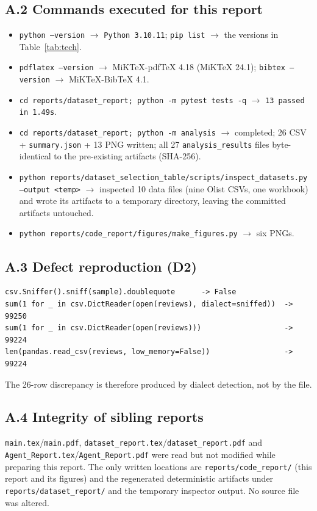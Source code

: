 \documentclass[11pt,a4paper]{article}
\newcommand{\code}[1]{\texttt{#1}}
\begin{document}
\subsection*{A.2 Commands executed for this report}
\begin{itemize}
\item \code{python --version} $\rightarrow$ \code{Python 3.10.11}; \code{pip list} $\rightarrow$ the versions in Table~\ref{tab:tech}.
\item \code{pdflatex --version} $\rightarrow$ MiKTeX-pdfTeX 4.18 (MiKTeX 24.1); \code{bibtex --version} $\rightarrow$ MiKTeX-BibTeX 4.1.
\item \code{cd reports/dataset\_report; python -m pytest tests -q} $\rightarrow$ \code{13 passed in 1.49s}.
\item \code{cd reports/dataset\_report; python -m analysis} $\rightarrow$ completed; 26 CSV + \code{summary.json} + 13 PNG written; all 27 \code{analysis\_results} files byte-identical to the pre-existing artifacts (SHA-256).
\item \code{python reports/dataset\_selection\_table/scripts/inspect\_datasets.py --output <temp>} $\rightarrow$ inspected 10 data files (nine Olist CSVs, one workbook) and wrote its artifacts to a temporary directory, leaving the committed artifacts untouched.
\item \code{python reports/code\_report/figures/make\_figures.py} $\rightarrow$ six PNGs.
\end{itemize}

\subsection*{A.3 Defect reproduction (D2)}
\begin{verbatim}
csv.Sniffer().sniff(sample).doublequote      -> False
sum(1 for _ in csv.DictReader(open(reviews), dialect=sniffed))  -> 99250
sum(1 for _ in csv.DictReader(open(reviews)))                   -> 99224
len(pandas.read_csv(reviews, low_memory=False))                 -> 99224
\end{verbatim}
The 26-row discrepancy is therefore produced by dialect detection, not by the file.

\subsection*{A.4 Integrity of sibling reports}
\code{main.tex}/\code{main.pdf}, \code{dataset\_report.tex}/\allowbreak\code{dataset\_report.pdf} and \code{Agent\_Report.tex}/\allowbreak\code{Agent\_Report.pdf} were read but not modified while preparing this report. The only written locations are \code{reports/code\_report/} (this report and its figures) and the regenerated deterministic artifacts under \code{reports/dataset\_report/} and the temporary inspector output. No source file was altered.
\end{document}
